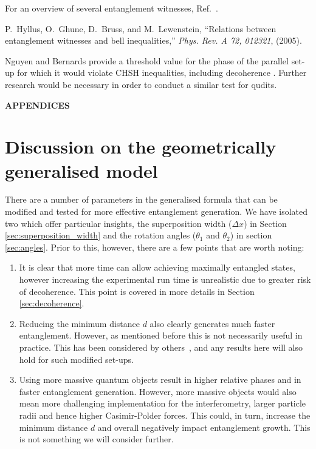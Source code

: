 \documentclass[%
 12pt,
 superscriptaddress,
 amsmath,
 amssymb,
 onecolumn,
 longbibliography
]{revtex4-2}
\begin{document}
\begin{thebibliography}{10}
For an overview of several entanglement witnesses, Ref.~\cite {Guhne2009}.

P.~Hyllus, O.~Ghune, D.~Bruss, and M.~Lewenstein, ``Relations between
  entanglement witnesses and bell inequalities,'' {\em Phys. Rev. A 72,
  012321}, (2005).

Nguyen and Bernards provide a threshold value for the phase of the parallel
  set-up for which it would violate CHSH inequalities, including decoherence
  \cite {Nguyen2019}. Further research would be necessary in order to conduct a
  similar test for qudits.

\end{thebibliography}

\newpage

\begin{appendices}
\begin{center}
    \textbf{APPENDICES}
\end{center}
	
\section{Discussion on the geometrically generalised model \label{sec:discussgeneral}}

\indent There are a number of parameters in the generalised formula that can be modified and tested for more effective entanglement generation. We have isolated two which offer particular insights, the superposition width ($\Delta x$) in Section \ref{sec:superposition_width} and the rotation angles ($\theta_1$ and $\theta_2$) in section \ref{sec:angles}. Prior to this, however, there are a few points that are worth noting:\\
\begin{enumerate}
    \item It is clear that more time can allow achieving maximally entangled states, however increasing the experimental run time is unrealistic due to greater risk of decoherence. This point is covered in more details in Section \ref{sec:decoherence}.
    \item Reducing the minimum distance $d$ also clearly generates much faster entanglement. However, as mentioned before this is not necessarily useful in practice. This has been considered by others~\cite{Kamp2020}, and any results here will also hold for such modified set-ups.
    \item Using more massive quantum objects result in higher relative phases and in faster entanglement generation. However, more massive objects would also mean more challenging implementation for the interferometry, larger particle radii and hence higher Casimir-Polder forces. This could, in turn, increase the minimum distance $d$ and overall negatively impact entanglement growth. This is not something we will consider further.
\end{enumerate}


\end{appendices}
\end{document}
